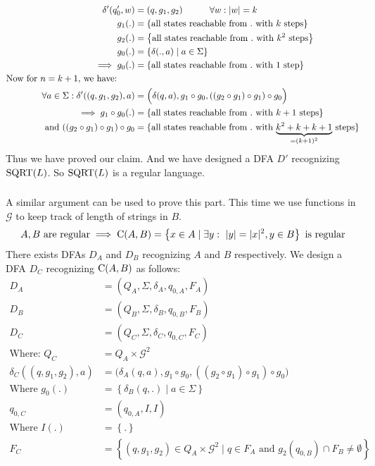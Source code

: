 \documentclass{article}
\numberwithin{equation}{subsection}
\newcommand{\setsubsubsectionnumber}[1]{\setcounter{subsubsection}{#1}\addtocounter{subsubsection}{-1}}
\newcommand{\abs}[1]{\vert #1\vert}
\newcommand{\tab}[1][30pt]{\hspace*{#1}}
\begin{document}
\begin{align}
\delta'(q_0', w) &= (q, g_1, g_2) \tab \forall w: \abs{w}=k\\
g_1(.) &= \left\{\text{all states reachable from \(.\) with \(k\) steps}\right\}\\
g_2(.) &= \left\{\text{all states reachable from \(.\) with \(k^2\) steps}\right\}\\
g_0(.) &= \left\{\delta(. , a)\mid a \in \Sigma\right\}\\
\implies g_0(.) & = \left\{\text{all states reachable from \(.\) with \(1\) step}\right\}\\
\text{Now for \(n=k+1\), we have:}\tag*{}\\
\forall a \in \Sigma: \delta'((q, g_1, g_2), a) &= \Big(\delta(q, a), g_1\circ g_0, ((g_2\circ g_1)\circ g_1)\circ g_0\Big)\\
\implies g_1\circ g_0(.) &= \left\{\text{all states reachable from \(.\) with \(k+1\) steps}\right\}\\
\text{and } ((g_2\circ g_1)\circ g_1)\circ g_0 &= \{\text{all states reachable from \(.\) with \(\underbrace{k^2 + k + k + 1}_{=(k+1)^2}\) steps}\}
\end{align}
Thus we have proved our claim.
And we have designed a DFA \(D'\) recognizing \(\textup{SQRT}(L)\).
So \(\textup{SQRT}(L)\) is a regular language.

\setsubsubsectionnumber{1}
\subsubsection{}
A similar argument can be used to prove this part.
This time we use functions in \(\mathcal{G}\) to keep track of length of strings in \(B\).
\begin{align}
A, B \text{ are regular} \implies \textup{C}(A, B) = \left\{x\in A \mid \exists y:\ \abs{y}=\abs{x}^2, y \in B \right\} \text{ is regular}
\end{align}
There exists DFAs \(D_A\) and \(D_B\) recognizing \(A\) and \(B\) respectively.
We design a DFA \(D_C\) recognizing \(\textup{C}(A, B)\) as follows:
\begin{align}
D_A &= (Q_A, \Sigma, \delta_A, q_{0, A}, F_A)\\
D_B &= (Q_B, \Sigma, \delta_B, q_{0, B}, F_B)\\
D_C &= (Q_C, \Sigma, \delta_C, q_{0, C}, F_C)\\
\text{Where: }Q_C &= Q_A \times \mathcal{G}^2\\
\delta_C((q, g_1, g_2), a) &= \Big(\delta_A(q, a), g_1\circ g_0, ((g_2\circ g_1)\circ g_1)\circ g_0\Big)\\
\text{Where }g_0(.) &= \left\{\delta_B(q, .)\mid a \in \Sigma\right\}\\
q_{0, C} &= (q_{0, A}, I, I)\\
\text{Where }I(.) &= \left\{.\right\}\\
F_C &= \left\{(q, g_1, g_2) \in Q_A\times \mathcal{G}^2 \mid q\in F_A \text{ and } g_2(q_{0,B}) \cap F_B \neq \emptyset\right\}
\end{align}
\end{document}
